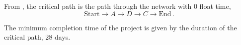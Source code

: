 \begin{subquestions}

\subquestion

\begin{subsubquestions}
	

\subsubquestion

From , the critical path is the path through the network with 0 float time,
\begin{equation}
	\text{Start} \rightarrow A \rightarrow D \rightarrow C \rightarrow \text{End}\,.
\end{equation}


\subsubquestion

The minimum completion time of the project is given by the duration of the critical path, $28$ days.
\end{subsubquestions}

\end{subquestions}

